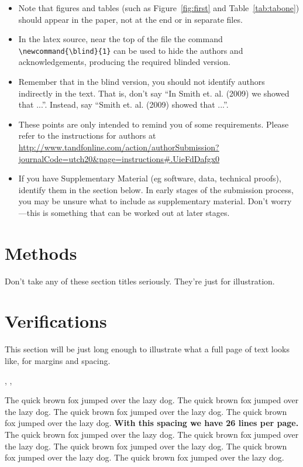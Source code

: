 \documentclass[12pt]{article}
\newcommand{\blind}{0}
\begin{document}
\begin{itemize}
\item Note that figures and tables (such as Figure~\ref{fig:first} and
Table~\ref{tab:tabone}) should appear in the paper, not at the end or
in separate files.
\item In the latex source, near the top of the file the command
\verb+\newcommand{\blind}{1}+ can be used to hide the authors and
acknowledgements, producing the required blinded version.
\item Remember that in the blind version, you should not identify authors
indirectly in the text.  That is, don't say ``In Smith et. al.  (2009) we
showed that ...''.  Instead, say ``Smith et. al. (2009) showed that ...''.
\item These points are only intended to remind you of some requirements.
Please refer to the instructions for authors
at \url{http://www.tandfonline.com/action/authorSubmission?journalCode=utch20&page=instructions#.UieFdDafgx0}
\item If you have Supplementary Material (eg software, data, technical
proofs), identify them in the section below.  In early stages of the
submission process, you may be unsure what to include as supplementary
material.  Don't worry---this is something that can be worked out at later stages.
\end{itemize}

\section{Methods}
\label{sec:meth}
Don't take any of these section titles seriously.  They're just for
illustration.

\section{Verifications}
\label{sec:verify}
This section will be just long enough to illustrate what a full page of
text looks like, for margins and spacing.


\cite{Campbell02}, \cite{Schubert13}, \cite{Chi81}


The quick brown fox jumped over the lazy dog.
The quick brown fox jumped over the lazy dog.
The quick brown fox jumped over the lazy dog.
The quick brown fox jumped over the lazy dog.
{\bf With this spacing we have 26 lines per page.}
The quick brown fox jumped over the lazy dog.
The quick brown fox jumped over the lazy dog.
The quick brown fox jumped over the lazy dog.
The quick brown fox jumped over the lazy dog.
The quick brown fox jumped over the lazy dog.
\end{document}

